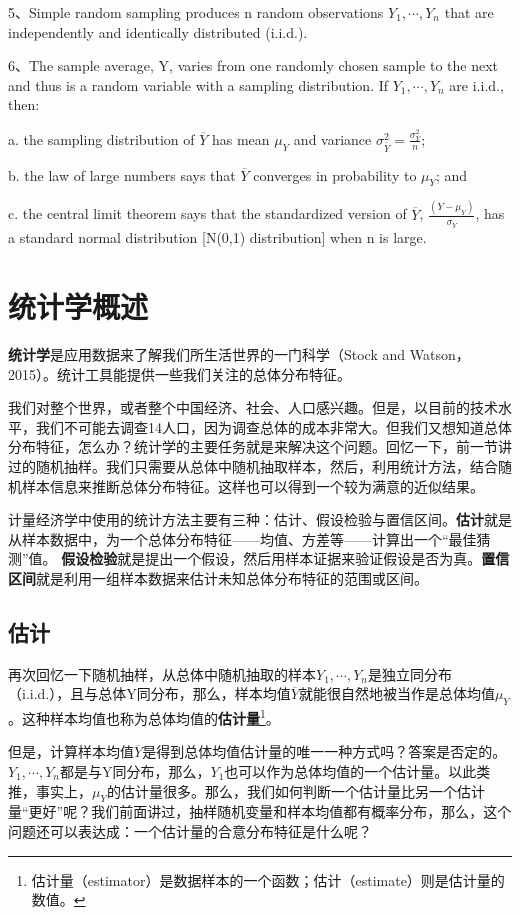 \documentclass[cn,12pt,math=newtx,citestyle=gb7714-2015,bibstyle=gb7714-2015]{elegantbook}
\begin{document}
	5、Simple random sampling produces n random observations $Y_1,\cdots,Y_n$ that are independently and identically distributed (i.i.d.).
	
	6、The sample average, Y, varies from one randomly chosen sample to the next
	and thus is a random variable with a sampling distribution. If $Y_1,\cdots,Y_n$ are
	i.i.d., then:
	
	a. the sampling distribution of $\overline{Y}$ has mean $\mu_Y$ and variance $\sigma_{\overline{Y}}^2=\frac{\sigma_{Y}^2}{n}$;
	
	b. the law of large numbers says that $\overline{Y}$ converges in probability to $\mu_Y$; and
	
	c. the central limit theorem says that the standardized version of $\overline{Y}$,
	$\frac{(Y-\mu_Y)}{\sigma_{\overline{Y}}}$, has a standard normal distribution [N(0,1) distribution] when n is large.
	
	
	\section{统计学概述}
	\textbf{统计学}是应用数据来了解我们所生活世界的一门科学（Stock and Watson，2015）。统计工具能提供一些我们关注的总体分布特征。
	
	我们对整个世界，或者整个中国经济、社会、人口感兴趣。但是，以目前的技术水平，我们不可能去调查14人口，因为调查总体的成本非常大。但我们又想知道总体分布特征，怎么办？统计学的主要任务就是来解决这个问题。回忆一下，前一节讲过的随机抽样。我们只需要从总体中随机抽取样本，然后，利用统计方法，结合随机样本信息来推断总体分布特征。这样也可以得到一个较为满意的近似结果。
	
	计量经济学中使用的统计方法主要有三种：估计、假设检验与置信区间。\textbf{估计}就是从样本数据中，为一个总体分布特征——均值、方差等——计算出一个“最佳猜测”值。
	\textbf{假设检验}就是提出一个假设，然后用样本证据来验证假设是否为真。\textbf{置信区间}就是利用一组样本数据来估计未知总体分布特征的范围或区间。
	
	\subsection{估计}
	再次回忆一下随机抽样，从总体中随机抽取的样本$Y_1,\cdots,Y_n$是独立同分布（i.i.d.），且与总体Y同分布，那么，样本均值$\overline{Y}$就能很自然地被当作是总体均值$\mu_Y$。这种样本均值也称为总体均值的\textbf{估计量}\footnote{估计量（estimator）是数据样本的一个函数；估计（estimate）则是估计量的数值。}。
	
	但是，计算样本均值$\overline{Y}$是得到总体均值估计量的唯一一种方式吗？答案是否定的。$Y_1,\cdots,Y_n$都是与Y同分布，那么，$Y_1$也可以作为总体均值的一个估计量。以此类推，事实上，$\mu_Y$的估计量很多。那么，我们如何判断一个估计量比另一个估计量“更好”呢？我们前面讲过，抽样随机变量和样本均值都有概率分布，那么，这个问题还可以表达成：一个估计量的合意分布特征是什么呢？
	
\end{document}
